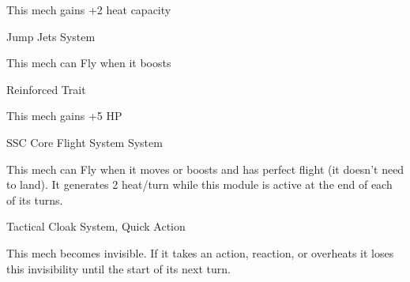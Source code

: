 This mech gains +2 heat capacity


Jump Jets
System

This mech can Fly when it boosts


Reinforced
Trait

This mech gains +5 HP


SSC Core Flight System
System

This mech can Fly when it moves or boosts and has perfect flight (it doesn’t need to land). It
generates 2 heat/turn while this module is active at the end of each of its turns.


Tactical Cloak
System, Quick Action

This mech becomes invisible. If it takes an action, reaction, or overheats it loses this invisibility
until the start of its next turn.